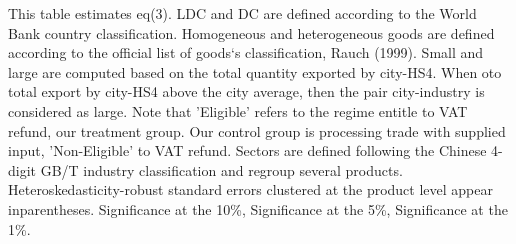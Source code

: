 \documentclass[preview]{standalone}
\begin{document}
\begin{table}[!htbp]
\begin{tablenotes}
This table estimates eq(3). 
LDC and DC are defined according to the World Bank country classification.
Homogeneous and heterogeneous goods are defined according to the official list of goods`s classification, Rauch (1999).
Small and large are computed based on the total quantity exported by city-HS4.
When oto total export by city-HS4 above the city average, then the pair city-industry is considered as large.
Note that 'Eligible' refers to the regime entitle to VAT refund, our treatment group.
Our control group is processing trade with supplied input, 'Non-Eligible' to VAT refund.
Sectors are defined following the Chinese 4-digit GB/T industry
classification and regroup several products.
Heteroskedasticity-robust standard errors
clustered at the product level appear inparentheses.
\sym{*} Significance at the 10\%, \sym{**} Significance at the 5\%, \sym{***} Significance at the 1\%. 
\end{tablenotes}
\end{table}
\end{document}
